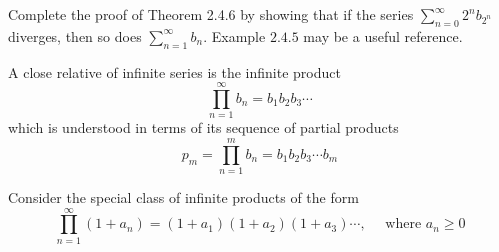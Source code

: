 \begin{exercise}
  Complete the proof of Theorem 2.4.6 by showing that if the series $\sum_{n=0}^{\infty} 2^{n} b_{2^{n}}$ diverges, then so does $\sum_{n=1}^{\infty} b_{n}$. Example $2.4 .5$ may be a useful reference.
\end{exercise}

\begin{solution}
  \TODO
\end{solution}

\begin{exercise}
  A close relative of infinite series is the infinite product
  $$
  \prod_{n=1}^{\infty} b_{n}=b_{1} b_{2} b_{3} \cdots
  $$
  which is understood in terms of its sequence of partial products
  $$
  p_{m}=\prod_{n=1}^{m} b_{n}=b_{1} b_{2} b_{3} \cdots b_{m}
  $$

  Consider the special class of infinite products of the form
  $$
  \prod_{n=1}^{\infty}\left(1+a_{n}\right)=\left(1+a_{1}\right)\left(1+a_{2}\right)\left(1+a_{3}\right) \cdots, \quad \text { where } a_{n} \geq 0
  $$
\end{exercise}

\begin{solution}
  \enum{
  \item \TODO
  \item \TODO
  }
\end{solution}
